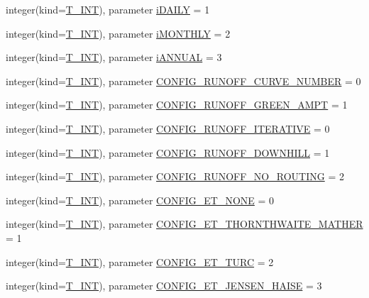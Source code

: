 \begin{DoxyCompactItemize}
\item 
integer(kind=\hyperlink{namespacetest_a6f91ebd89b58cfcc5da99faed9385c1e}{T\_\-INT}), parameter \hyperlink{namespacetest_a48081398f90bec0222d878b534da1320}{iDAILY} = 1
\item 
integer(kind=\hyperlink{namespacetest_a6f91ebd89b58cfcc5da99faed9385c1e}{T\_\-INT}), parameter \hyperlink{namespacetest_ae6a20a8c4dbaebffde9b9b7c933237b4}{iMONTHLY} = 2
\item 
integer(kind=\hyperlink{namespacetest_a6f91ebd89b58cfcc5da99faed9385c1e}{T\_\-INT}), parameter \hyperlink{namespacetest_a952527c86ef64f1bf77dc314ac43c14e}{iANNUAL} = 3
\item 
integer(kind=\hyperlink{namespacetest_a6f91ebd89b58cfcc5da99faed9385c1e}{T\_\-INT}), parameter \hyperlink{namespacetest_aa4c0a351964701262a252e1174d8959c}{CONFIG\_\-RUNOFF\_\-CURVE\_\-NUMBER} = 0
\item 
integer(kind=\hyperlink{namespacetest_a6f91ebd89b58cfcc5da99faed9385c1e}{T\_\-INT}), parameter \hyperlink{namespacetest_aaef68858ea9447158dabcb1edc0bc51c}{CONFIG\_\-RUNOFF\_\-GREEN\_\-AMPT} = 1
\item 
integer(kind=\hyperlink{namespacetest_a6f91ebd89b58cfcc5da99faed9385c1e}{T\_\-INT}), parameter \hyperlink{namespacetest_a7359910b1beaefb9b4c414836e39093b}{CONFIG\_\-RUNOFF\_\-ITERATIVE} = 0
\item 
integer(kind=\hyperlink{namespacetest_a6f91ebd89b58cfcc5da99faed9385c1e}{T\_\-INT}), parameter \hyperlink{namespacetest_a27b920f67f809bcc8d0cc06a9632d4f2}{CONFIG\_\-RUNOFF\_\-DOWNHILL} = 1
\item 
integer(kind=\hyperlink{namespacetest_a6f91ebd89b58cfcc5da99faed9385c1e}{T\_\-INT}), parameter \hyperlink{namespacetest_a53493938592d43a28a0b3efc51753e2d}{CONFIG\_\-RUNOFF\_\-NO\_\-ROUTING} = 2
\item 
integer(kind=\hyperlink{namespacetest_a6f91ebd89b58cfcc5da99faed9385c1e}{T\_\-INT}), parameter \hyperlink{namespacetest_aeaf62d9982d23ab73d24f5367a32aaf7}{CONFIG\_\-ET\_\-NONE} = 0
\item 
integer(kind=\hyperlink{namespacetest_a6f91ebd89b58cfcc5da99faed9385c1e}{T\_\-INT}), parameter \hyperlink{namespacetest_a10c79733bc37cb1c88dd6f84d08c2012}{CONFIG\_\-ET\_\-THORNTHWAITE\_\-MATHER} = 1
\item 
integer(kind=\hyperlink{namespacetest_a6f91ebd89b58cfcc5da99faed9385c1e}{T\_\-INT}), parameter \hyperlink{namespacetest_a9281ad856dadeb5f57137bd0e6219fa9}{CONFIG\_\-ET\_\-TURC} = 2
\item 
integer(kind=\hyperlink{namespacetest_a6f91ebd89b58cfcc5da99faed9385c1e}{T\_\-INT}), parameter \hyperlink{namespacetest_a2b90273702b4e7d130ec76d6e3eda6c7}{CONFIG\_\-ET\_\-JENSEN\_\-HAISE} = 3

\end{DoxyCompactItemize}
